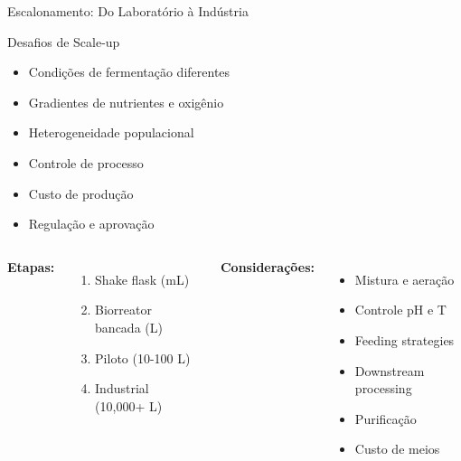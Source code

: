 \begin{frame}{Escalonamento: Do Laboratório à Indústria}
\begin{block}{Desafios de Scale-up}
\begin{itemize}
    \item Condições de fermentação diferentes
    \item Gradientes de nutrientes e oxigênio
    \item Heterogeneidade populacional
    \item Controle de processo
    \item Custo de produção
    \item Regulação e aprovação
\end{itemize}
\end{block}

\vspace{0.3cm}

\begin{columns}
\textbf{Etapas:}
\begin{enumerate}
    \item Shake flask (mL)
    \item Biorreator bancada (L)
    \item Piloto (10-100 L)
    \item Industrial (10,000+ L)
\end{enumerate}

\textbf{Considerações:}
\begin{itemize}
    \item Mistura e aeração
    \item Controle pH e T
    \item Feeding strategies
    \item Downstream processing
    \item Purificação
    \item Custo de meios
\end{itemize}
\end{columns}

\vspace{0.3cm}

\end{frame}

